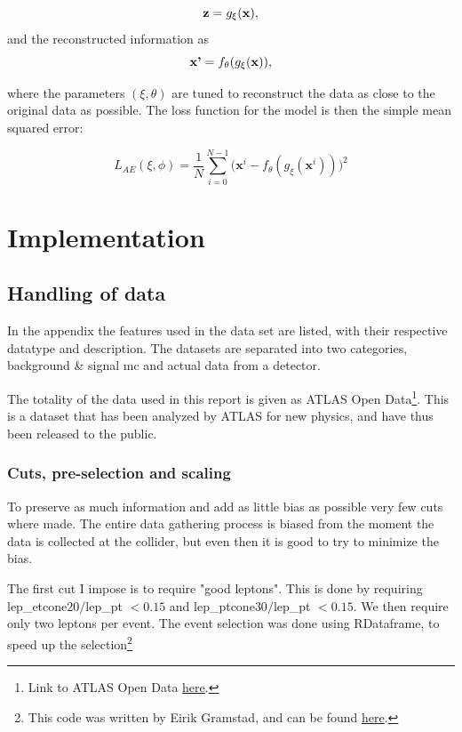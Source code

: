 \documentclass[ reprint, amsmath,amssymb, aps, nofootinbib]{revtex4-2}
\begin{document}
\begin{equation*}
    \textbf{z} = g_{\xi}(\bf{x}),
\end{equation*}
and the reconstructed information as 
\begin{equation*}
    \textbf{x'} = f_{\theta}(g_{\xi}(\bf{x})),
\end{equation*}

where the parameters $(\xi, \theta)$ are tuned to reconstruct the data as close to the original data as possible. The loss function for the model is then the simple mean squared error:

\begin{equation*}
    L_{AE}(\xi, \phi)= \frac{1}{N} \sum_{i=0}^{N-1}\bigg( \textbf{x}^i - f_{\theta}(g_{\xi}(\textbf{x}^i))\bigg)^2
\end{equation*}



\section{Implementation}

\subsection{Handling of data}

In the appendix the features used in the data set are listed, with their respective datatype and description. The datasets are separated into two categories, background \& signal mc and actual data from a detector. 

The totality of the data used in this report is given as ATLAS Open Data\footnote{Link to ATLAS Open Data \href{https://atlas.cern/resources/opendata}{here}.}. This is a dataset that has been analyzed by ATLAS for new physics, and have thus been released to the public. 

\subsubsection{Cuts, pre-selection and scaling}
To preserve as much information and add as little bias as possible very few cuts where made. The entire data gathering process is biased from the moment the data is collected at the collider, but even then it is good to try to minimize the bias. \par

The first cut I impose is to require "good leptons". This is done by requiring lep\_etcone$20/$lep\_pt $< 0.15$ and lep\_ptcone$30/$lep\_pt $< 0.15$. We then require only two leptons per event. The event selection was done using RDataframe\cite{rene_al._2019}, to speed up the selection\footnote{This code was written by Eirik Gramstad, and can be found \href{https://github.uio.no/zpath/software/blob/eirik-dev/Notebooks/ATLASOpenData/13TeV/RDataFrameToDF.ipynb}{here}.}\par 
\end{document}
